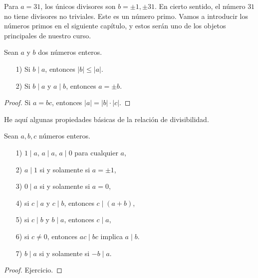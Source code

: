 \begin{ejemplo}
  Para $a = 31$, los únicos divisores son $b = \pm 1, \pm 31$. En cierto
  sentido, el número $31$ no tiene divisores no triviales. Este es un número
  primo. Vamos a introducir los números primos en el siguiente capítulo, y estos
  serán uno de los objetos principales de nuestro curso.
\end{ejemplo}

\begin{proposicion}
  Sean $a$ y $b$ dos números enteros.

  \begin{enumerate}
  \item[1)] Si $b \mid a$, entonces $|b| \le |a|$.

  \item[2)] Si $b \mid a$ y $a \mid b$, entonces $a = \pm b$.
  \end{enumerate}

  \begin{proof}
    Si $a = bc$, entonces $|a| = |b| \cdot |c|$.
  \end{proof}
\end{proposicion}

He aquí algunas propiedades básicas de la relación de divisibilidad.

\begin{proposicion}
  Sean $a,b,c$ números enteros.

  \begin{enumerate}
  \item[1)] $1\mid a$, $a \mid a$, $a \mid 0$ para cualquier $a$,

  \item[2)] $a\mid 1$ si y solamente si $a = \pm 1$,

  \item[3)] $0\mid a$ si y solamente si $a = 0$,

  \item[4)] si $c \mid a$ y $c \mid b$, entonces $c \mid (a + b)$,

  \item[5)] si $c \mid b$ y $b \mid a$, entonces $c \mid a$,

  \item[6)] si $c \ne 0$, entonces $ac \mid bc$ implica $a\mid b$.

  \item[7)] $b \mid a$ si y solamente si $-b \mid a$.
  \end{enumerate}

  \begin{proof}
    Ejercicio.
  \end{proof}
\end{proposicion}

